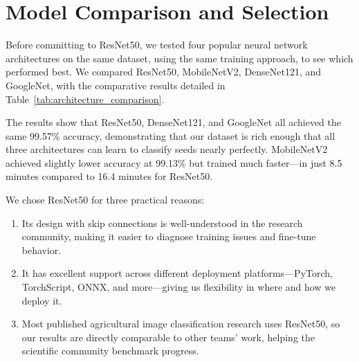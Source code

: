 \section{Model Comparison and Selection}

Before committing to ResNet50, we tested four popular neural network architectures on the same dataset, using the same training approach, to see which performed best. We compared ResNet50, MobileNetV2, DenseNet121, and GoogleNet, with the comparative results detailed in Table~\ref{tab:architecture_comparison}.

\begin{table}[htbp]
\centering
\caption{Architecture Comparison on Test Set}
\label{tab:architecture_comparison}
\end{table}

The results show that ResNet50, DenseNet121, and GoogleNet all achieved the same 99.57\% accuracy, demonstrating that our dataset is rich enough that all three architectures can learn to classify seeds nearly perfectly. MobileNetV2 achieved slightly lower accuracy at 99.13\% but trained much faster—in just 8.5 minutes compared to 16.4 minutes for ResNet50.

We chose ResNet50 for three practical reasons:

\begin{enumerate}
    \item Its design with skip connections is well-understood in the research community, making it easier to diagnose training issues and fine-tune behavior.
    
    \item It has excellent support across different deployment platforms—PyTorch, TorchScript, ONNX, and more—giving us flexibility in where and how we deploy it.
    
    \item Most published agricultural image classification research uses ResNet50, so our results are directly comparable to other teams' work, helping the scientific community benchmark progress.
\end{enumerate}

